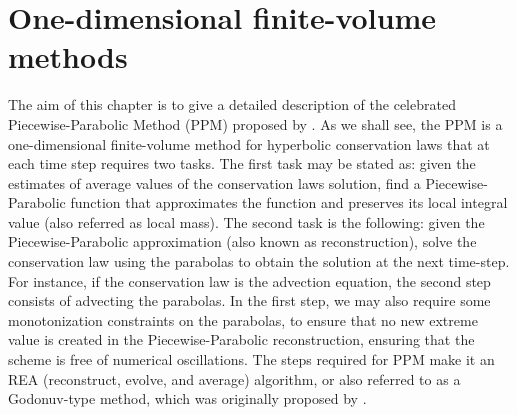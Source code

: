 \chapter{One-dimensional finite-volume methods}
\label{chp-1d-fv}

\theoremstyle{plain}
\newtheorem{lema}{Lemma}[chapter]

\theoremstyle{plain}
\newtheorem{prop}{Proposition}[chapter]

\theoremstyle{plain}
\newtheorem{remark}{Remark}[chapter]

\theoremstyle{plain}
\newtheorem{corollary}{Corollary}[chapter]

\theoremstyle{plain}
\newtheorem{definition}{Definition}[chapter]


The aim of this chapter is to give a detailed description of the celebrated
Piecewise-Parabolic Method (PPM) proposed by \citet{colella:1984}.
As we shall see, the PPM is a one-dimensional finite-volume method for
hyperbolic conservation laws that at each time step requires two tasks. 
The first task may be stated as: given the estimates of average values of the
conservation laws solution, find a Piecewise-Parabolic function that approximates 
the function and preserves its local integral value (also referred as local mass).
The second task is the following: given the Piecewise-Parabolic approximation 
(also known as reconstruction), solve the conservation law using the parabolas 
to obtain the solution at the next time-step.
For instance, if the conservation law is the advection equation, the second step
consists of advecting the parabolas.
In the first step, we may also require some monotonization constraints on the parabolas,
to ensure that no new extreme value is created in the Piecewise-Parabolic reconstruction, 
ensuring that the scheme is free of numerical oscillations.
The steps required for PPM make it an REA (reconstruct, evolve, and average) algorithm,
or also referred to as a Godonuv-type method, which was originally proposed by 
\citet{godunov:1959}.

